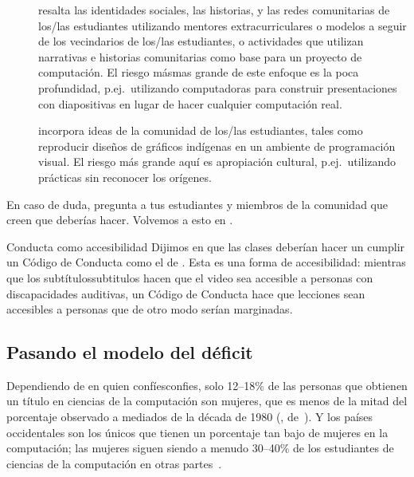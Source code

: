 \begin{description}

\item[{}]
  resalta las identidades sociales, las historias, y las redes comunitarias de los/las estudiantes
  utilizando mentores extracurriculares o modelos a seguir de los vecindarios de los/las estudiantes,
  o actividades que utilizan narrativas e historias comunitarias
  como base para un proyecto de computación.
  El riesgo másmas grande de este enfoque es la poca profundidad,
  p.ej.\ utilizando computadoras para construir presentaciones con diapositivas en lugar de hacer cualquier computación real.

\item[{}]
  incorpora ideas de la comunidad de los/las estudiantes,
  tales como reproducir diseños de gráficos indígenas en un ambiente de programación visual.
  El riesgo más grande aquí es apropiación cultural,
  p.ej.\ utilizando prácticas sin reconocer los orígenes.

\end{description}

En caso de duda,
pregunta a tus estudiantes y miembros de la comunidad que creen que deberías hacer.
Volvemos a esto en .

\begin{aside}{Conducta como accesibilidad}
  Dijimos en  que las clases deberían hacer un cumplir un Código de Conducta como el de .
  Esta es una forma de accesibilidad:
  mientras que los subtítulossubtitulos hacen que el video sea accesible a personas con discapacidades auditivas,
  un Código de Conducta hace que lecciones sean accesibles a personas que de otro modo serían marginadas.
\end{aside}

\subsection*{Pasando el modelo del déficit}

Dependiendo de en quien confíesconfies,
solo 12--18\% de las personas que obtienen un título en ciencias de la computación son mujeres,
que es menos de la mitad del porcentaje observado a mediados de la década de 1980
(, de~\cite{Robe2017}).
Y los países occidentales son los únicos que tienen un porcentaje tan bajo de mujeres en la computación;
las mujeres siguen siendo a menudo 30--40\% de los estudiantes de ciencias de la computación en otras partes~\cite{Galp2002,Varm2015}.

